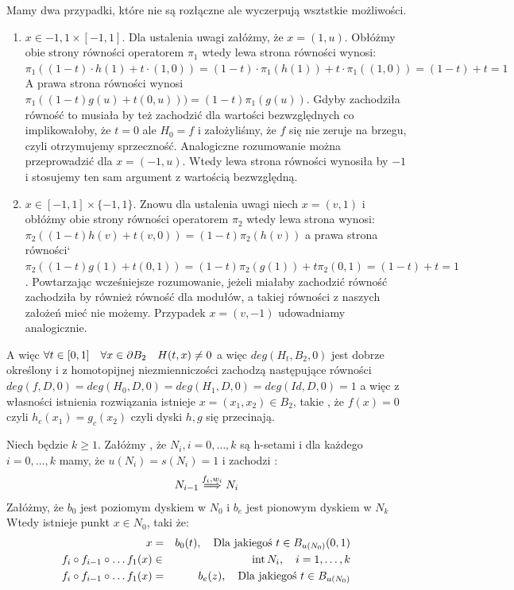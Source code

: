   Mamy dwa przypadki, które nie są rozłączne ale wyczerpują wsztstkie możliwości.
  \begin{enumerate}
   \item $ x \in {-1,1} \times [-1,1] $. \newline
    Dla ustalenia uwagi załóżmy, że $ x = (1,u) $. Obłóżmy obie strony równości operatorem $ \pi_1$ 
    wtedy lewa strona równości wynosi:
    $\pi_1((1-t) \cdot h(1) + t \cdot (1,0)) = (1-t) \cdot \pi_1(h(1)) + t \cdot \pi_1((1,0)) = (1-t) + t = 1$
    A prawa strona równości wynosi $ \pi_1( (1-t)g(u) + t(0,u) )) = (1-t)\pi_1(g(u)) $.
    Gdyby zachodziła równość to musiała by też zachodzić dla wartości bezwzględnych co implikowałoby,
    że $ t = 0 $ ale $ H_0 = f $ i założyliśmy, że $ f $ się nie zeruje na brzegu, czyli otrzymujemy sprzeczność.
    Analogiczne rozumowanie można przeprowadzić dla $ x = (-1,u) $. Wtedy lewa strona równości wynosiła by $ -1 $ 
    i stosujemy ten sam argument z wartością bezwzględną.
    
    \item $ x \in [-1,1]\times \{ -1,1\} $. \newline
    Znowu dla ustalenia uwagi niech $ x = (v,1) $ i obłóżmy obie strony równości operatorem  $ \pi_2 $
    wtedy lewa strona wynosi:
    $ \pi_2((1-t)h(v) + t(v,0)) = (1-t)\pi_2(h(v)) $
    a prawa strona równości`
   $ \pi_2( (1-t)g(1) + t(0,1)) = (1-t)\pi_2(g(1)) + t\pi_2(0,1)  = (1-t) + t = 1 $.
   Powtarzając wcześniejsze rozumowanie, jeżeli miałaby zachodzić równość zachodziła by również równość dla modułów, a takiej równości z 
   naszych założeń mieć nie możemy. Przypadek $ x = (v,-1) $ udowadniamy analogicznie.
   
  \end{enumerate}
  
  A więc $ \forall t \in [0,1] \quad \forall x \in \partial B_2 \quad H(t,x) \neq 0 $ a więc $ deg(H_t,B_2,0) $ jest dobrze określony i 
  z homotopijnej niezmienniczości zachodzą następujące równości
  $ deg (f,D,0) = deg(H_0,D,0) = deg(H_1,D,0) = deg(Id,D,0) = 1 $ 
  a więc z własności istnienia rozwiązania istnieje $ x = (x_1,x_2) \in B_2 $, takie , że $f(x) = 0 $ czyli 
  $ h_c(x_1) = g_c(x_2) $ czyli dyski $h,g$ się przecinają.

\begin{theorem}
	Niech będzie $k \geq 1 $. Załóżmy , że $N_i, i = 0, \dots ,k $ są h-setami
	i dla każdego $ i = 0, \dots ,k $ mamy, że $ u(N_i) = s(N_i) = 1 $ i zachodzi :
	\begin{eqnarray*}
  		N_{i-1} \stackrel{f_i,w_i}{\Longrightarrow} N_i
	\end{eqnarray*}
	Załóżmy, że $b_0$ jest poziomym dyskiem w $N_0$ i $b_e$ jest pionowym dyskiem
	w $ N_k$ 
	Wtedy istnieje punkt $ x \in  N_0$, taki  że:
	\begin{eqnarray*}
   	x&=&b_0(t), \quad \mbox{Dla jakiegoś } t \in B_{u(N_0)}(0,1) \\
    f_i \circ f_{i-1} \circ \dots f_1(x) &\in &{\rm int}\, N_i, \quad i = 1, \dots , k \\
    f_i \circ f_{i-1} \circ \dots f_1(x) &=& b_e(z) ,\quad \mbox{Dla jakiegoś } t \in B_{u(N_0)}
	\end{eqnarray*}

\end{theorem}

